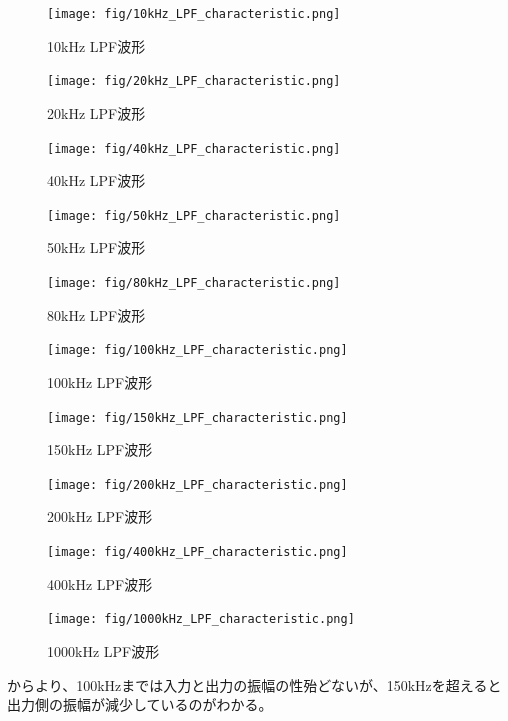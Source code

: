 \documentclass[11pt,dvipdfmx]{jarticle}
\begin{document}
\begin{figure}[H]
  \centering
  \texttt{[image: fig/10kHz\_LPF\_characteristic.png]}
  \caption{10kHz LPF波形}
  \label{fig:10kHz_LPF}
\end{figure}
\begin{figure}[H]
  \centering
  \texttt{[image: fig/20kHz\_LPF\_characteristic.png]}
  \caption{20kHz LPF波形}
  \label{fig:20kHz_LPF}
\end{figure}
\begin{figure}[H]
  \centering
  \texttt{[image: fig/40kHz\_LPF\_characteristic.png]}
  \caption{40kHz LPF波形}
  \label{fig:40kHz_LPF}
\end{figure}
\begin{figure}[H]
  \centering
  \texttt{[image: fig/50kHz\_LPF\_characteristic.png]}
  \caption{50kHz LPF波形}
  \label{fig:50kHz_LPF}
\end{figure}
\begin{figure}[H]
  \centering
  \texttt{[image: fig/80kHz\_LPF\_characteristic.png]}
  \caption{80kHz LPF波形}
  \label{fig:80kHz_LPF}
\end{figure}
\begin{figure}[H]
  \centering
  \texttt{[image: fig/100kHz\_LPF\_characteristic.png]}
  \caption{100kHz LPF波形}
  \label{fig:100kHz_LPF}
\end{figure}
\begin{figure}[H]
  \centering
  \texttt{[image: fig/150kHz\_LPF\_characteristic.png]}
  \caption{150kHz LPF波形}
  \label{fig:150kHz_LPF}
\end{figure}
\begin{figure}[H]
  \centering
  \texttt{[image: fig/200kHz\_LPF\_characteristic.png]}
  \caption{200kHz LPF波形}
  \label{fig:200kHz_LPF}
\end{figure}
\begin{figure}[H]
  \centering
  \texttt{[image: fig/400kHz\_LPF\_characteristic.png]}
  \caption{400kHz LPF波形}
  \label{fig:400kHz_LPF}
\end{figure}
\begin{figure}[H]
  \centering
  \texttt{[image: fig/1000kHz\_LPF\_characteristic.png]}
  \caption{1000kHz LPF波形}
  \label{fig:1000kHz_LPF}
\end{figure}
からより、100kHzまでは入力と出力の振幅の性殆どないが、150kHzを超えると出力側の振幅が減少しているのがわかる。
\end{document}
